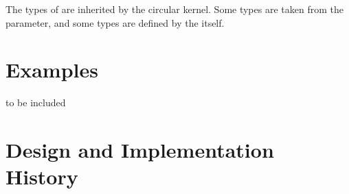 The types of  are inherited by the circular kernel.
Some types are taken from the  parameter, and
some types are defined by the  itself.

\section{Examples}

to be included

\section{Design and Implementation History}
